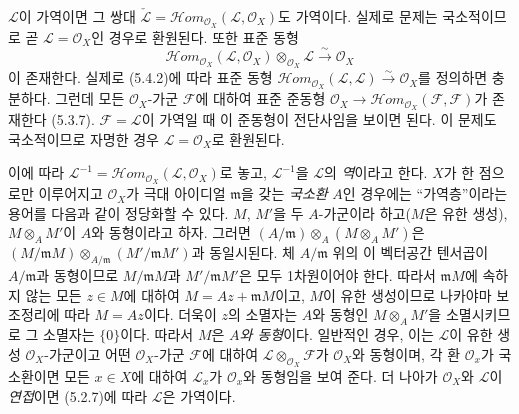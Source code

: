 \begin{env}[5.4.3]
\label{0.5.4.3-ko}
$\mathcal L$이 가역이면 그 쌍대
$\check{\mathcal L}=\mathcal H\!om_{\mathcal O_X}
(\mathcal L,\mathcal O_X)$도 가역이다. 실제로 문제는 국소적이므로 곧
$\mathcal L=\mathcal O_X$인 경우로 환원된다. 또한 표준 동형
\[
  \mathcal H\!om_{\mathcal O_X}(\mathcal L,\mathcal O_X)
  \otimes_{\mathcal O_X}\mathcal L
  \xrightarrow{\sim}
  \mathcal O_X
  \tag{5.4.3.1}\label{0.5.4.3.1-ko}
\]
이 존재한다. 실제로 (5.4.2)에 따라 표준 동형
$\mathcal H\!om_{\mathcal O_X}(\mathcal L,\mathcal L)
\xrightarrow{\sim}\mathcal O_X$를 정의하면 충분하다. 그런데 모든
$\mathcal O_X$-가군 $\mathcal F$에 대하여 표준 준동형
$\mathcal O_X\longrightarrow
\mathcal H\!om_{\mathcal O_X}(\mathcal F,\mathcal F)$가 존재한다
(5.3.7). $\mathcal F=\mathcal L$이 가역일 때 이 준동형이 전단사임을
보이면 된다. 이 문제도 국소적이므로 자명한 경우
$\mathcal L=\mathcal O_X$로 환원된다.

이에 따라
$\mathcal L^{-1}=\mathcal H\!om_{\mathcal O_X}
(\mathcal L,\mathcal O_X)$로 놓고, $\mathcal L^{-1}$을
$\mathcal L$의 \emph{역}이라고 한다. $X$가 한 점으로만 이루어지고
$\mathcal O_X$가 극대 아이디얼 $\mathfrak m$을 갖는 \emph{국소환}
$A$인 경우에는 ``가역층''이라는 용어를 다음과 같이 정당화할 수 있다.
$M$, $M'$을 두 $A$-가군이라 하고($M$은 유한 생성),
$M\otimes_A M'$이 $A$와 동형이라고 하자. 그러면
$(A/\mathfrak m)\otimes_A(M\otimes_A M')$은
$(M/\mathfrak mM)\otimes_{A/\mathfrak m}(M'/\mathfrak mM')$과
동일시된다. 체 $A/\mathfrak m$ 위의 이 벡터공간 텐서곱이
$A/\mathfrak m$과 동형이므로 $M/\mathfrak mM$과
$M'/\mathfrak mM'$은 모두 1차원이어야 한다. 따라서
$\mathfrak mM$에 속하지 않는 모든 $z\in M$에 대하여
$M=Az+\mathfrak mM$이고, $M$이 유한 생성이므로 나카야마 보조정리에
따라 $M=Az$이다. 더욱이 $z$의 소멸자는 $A$와 동형인
$M\otimes_A M'$을 소멸시키므로 그 소멸자는 $\{0\}$이다. 따라서
$M$은 \emph{$A$와 동형}이다. 일반적인 경우, 이는 $\mathcal L$이
유한 생성 $\mathcal O_X$-가군이고 어떤 $\mathcal O_X$-가군
$\mathcal F$에 대하여
$\mathcal L\otimes_{\mathcal O_X}\mathcal F$가 $\mathcal O_X$와
동형이며, 각 환 $\mathcal O_x$가 국소환이면 모든 $x\in X$에 대하여
$\mathcal L_x$가 $\mathcal O_x$와 동형임을 보여 준다. 더 나아가
$\mathcal O_X$와 $\mathcal L$이 \emph{연접}이면 (5.2.7)에 따라
$\mathcal L$은 가역이다.
\end{env}

